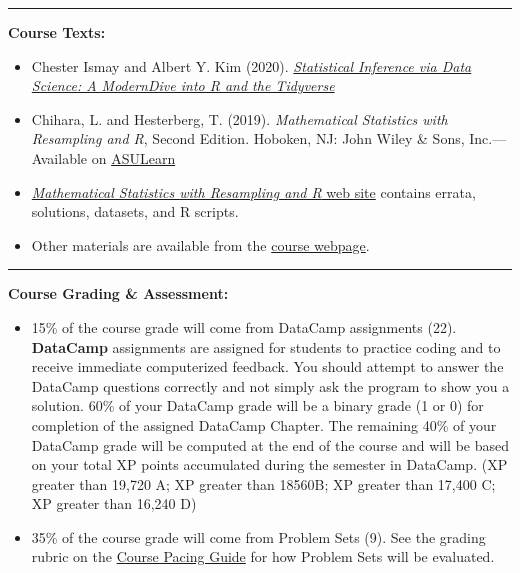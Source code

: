 \documentclass[
]{article}
\begin{document}
\begin{center}\rule{0.5\linewidth}{0.5pt}\end{center}

\textbf{Course Texts:}

\begin{itemize}
\item
  Chester Ismay and Albert Y. Kim (2020).
  \href{htpps://moderndive.com}{\emph{Statistical Inference via Data
  Science: A ModernDive into R and the Tidyverse }}
\item
  Chihara, L. and Hesterberg, T. (2019). \emph{Mathematical Statistics
  with Resampling and R}, Second Edition. Hoboken, NJ: John Wiley \&
  Sons, Inc.---Available on
  \href{https://asulearn.appstate.edu/course/view.php?id=177490}{ASULearn}
\item
  \href{https://sites.google.com/site/chiharahesterberg/home}{\emph{Mathematical
  Statistics with Resampling and R} web site} contains errata,
  solutions, datasets, and R scripts.
\item
  Other materials are available from the
  \href{https://alanarnholt.github.io/STT3850/}{course webpage}.
\end{itemize}

\begin{center}\rule{0.5\linewidth}{0.5pt}\end{center}

\textbf{Course Grading \& Assessment:}

\begin{itemize}
\item
  15\% of the course grade will come from DataCamp assignments (22).
  \textbf{DataCamp} assignments are assigned for students to practice
  coding and to receive immediate computerized feedback. You should
  attempt to answer the DataCamp questions correctly and not simply ask
  the program to show you a solution. 60\% of your DataCamp grade will
  be a binary grade (1 or 0) for completion of the assigned DataCamp
  Chapter. The remaining 40\% of your DataCamp grade will be computed at
  the end of the course and will be based on your total XP points
  accumulated during the semester in DataCamp. (XP greater than 19,720
  A; XP greater than 18560B; XP greater than 17,400 C; XP greater than
  16,240 D)
\item
  35\% of the course grade will come from Problem Sets (9). See the
  grading rubric on the
  \href{../CoursePacing/CoursePacingF2024.html}{Course Pacing Guide} for
  how Problem Sets will be evaluated.
\end{itemize}
\end{document}
